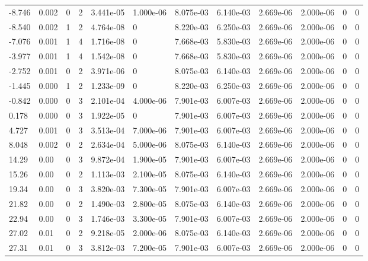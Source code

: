 \documentclass[preview]{standalone}
\begin{document}
{{\begin{tabular}{L{1.2cm}C{1.2cm} C{0.3cm}C{0.5cm} C{1.4cm}C{1.4cm} C{1.4cm}C{1.4cm} C{1.6cm}C{1.6cm} C{1.6cm}C{1.6cm}}
  -8.746  &  0.002  & 0     &  2 &  3.441e-05  & 1.000e-06  &  8.075e-03&   6.140e-03& 2.669e-06 & 2.000e-06   &  0 & 0  \\ 
  -8.540  &  0.002  & 1     &  2 &  4.764e-08  & 0  &  8.220e-03&   6.250e-03& 2.669e-06 & 2.000e-06   &  0 & 0  \\ 
  -7.076  &  0.001  & 1     &  4 &  1.716e-08  & 0  &  7.668e-03&   5.830e-03& 2.669e-06 & 2.000e-06   &  0 & 0  \\ 
  -3.977  &  0.001  & 1     &  4 &  1.542e-08  & 0  &  7.668e-03&   5.830e-03& 2.669e-06 & 2.000e-06   &  0 & 0  \\ 
  -2.752  &  0.001  & 0     &  2 &  3.971e-06  & 0  &  8.075e-03&   6.140e-03& 2.669e-06 & 2.000e-06   &  0 & 0  \\ 
  -1.445  &  0.000  & 1     &  2 &  1.233e-09  & 0  &  8.220e-03&   6.250e-03& 2.669e-06 & 2.000e-06   &  0 & 0  \\ 
  -0.842  &  0.000  & 0     &  3 &  2.101e-04  & 4.000e-06  &  7.901e-03&   6.007e-03& 2.669e-06 & 2.000e-06   &  0 & 0  \\ 
  0.178  &  0.000  & 0     &  3 &  1.922e-05  & 0  &  7.901e-03&   6.007e-03& 2.669e-06 & 2.000e-06   &  0 & 0  \\ 
  4.727  &  0.001  & 0     &  3 &  3.513e-04  & 7.000e-06  &  7.901e-03&   6.007e-03& 2.669e-06 & 2.000e-06   &  0 & 0  \\ 
  8.048  &  0.002  & 0     &  2 &  2.634e-04  & 5.000e-06  &  8.075e-03&   6.140e-03& 2.669e-06 & 2.000e-06   &  0 & 0  \\ 
  14.29  &  0.00  & 0     &  3 &  9.872e-04  & 1.900e-05  &  7.901e-03&   6.007e-03& 2.669e-06 & 2.000e-06   &  0 & 0  \\ 
  15.26  &  0.00  & 0     &  2 &  1.113e-03  & 2.100e-05  &  8.075e-03&   6.140e-03& 2.669e-06 & 2.000e-06   &  0 & 0  \\ 
  19.34  &  0.00  & 0     &  3 &  3.820e-03  & 7.300e-05  &  7.901e-03&   6.007e-03& 2.669e-06 & 2.000e-06   &  0 & 0  \\ 
  21.82  &  0.00  & 0     &  2 &  1.490e-03  & 2.800e-05  &  8.075e-03&   6.140e-03& 2.669e-06 & 2.000e-06   &  0 & 0  \\ 
  22.94  &  0.00  & 0     &  3 &  1.746e-03  & 3.300e-05  &  7.901e-03&   6.007e-03& 2.669e-06 & 2.000e-06   &  0 & 0  \\ 
  27.02  &  0.01  & 0     &  2 &  9.218e-05  & 2.000e-06  &  8.075e-03&   6.140e-03& 2.669e-06 & 2.000e-06   &  0 & 0  \\ 
  27.31  &  0.01  & 0     &  3 &  3.812e-03  & 7.200e-05  &  7.901e-03&   6.007e-03& 2.669e-06 & 2.000e-06   &  0 & 0  \\ 

\end{tabular}}}
\end{document}
